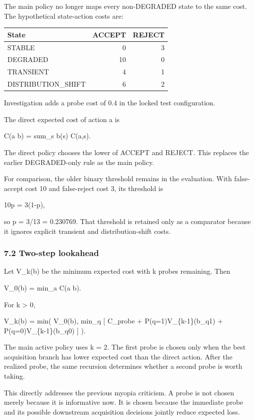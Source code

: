 \documentclass[
]{article}
\begin{document}
The main policy no longer maps every non-DEGRADED state to the same cost. The hypothetical state-action costs are:

\begin{longtable}[]{@{}lrr@{}}
\toprule\noalign{}
State & ACCEPT & REJECT \\
\midrule\noalign{}
\endhead
\bottomrule\noalign{}
\endlastfoot
STABLE & 0 & 3 \\
DEGRADED & 10 & 0 \\
TRANSIENT & 4 & 1 \\
DISTRIBUTION\_SHIFT & 6 & 2 \\
\end{longtable}

Investigation adds a probe cost of 0.4 in the locked test configuration.

The direct expected cost of action a is

C(a \textbar{} b) = sum\_s b(s) C(a,s).

The direct policy chooses the lower of ACCEPT and REJECT. This replaces the earlier DEGRADED-only rule as the main policy.

For comparison, the older binary threshold remains in the evaluation. With false-accept cost 10 and false-reject cost 3, its threshold is

10p = 3(1-p),

so p = 3/13 = 0.230769. That threshold is retained only as a comparator because it ignores explicit transient and distribution-shift costs.

\subsubsection{7.2 Two-step lookahead}\label{72-two-step-lookahead}

Let V\_k(b) be the minimum expected cost with k probes remaining. Then

V\_0(b) = min\_a C(a \textbar{} b).

For k \textgreater{} 0,

V\_k(b) = min( V\_0(b), min\_q {[} C\_probe + P(q=1)V\_\{k-1\}(b\_q1) + P(q=0)V\_\{k-1\}(b\_q0) {]} ).

The main active policy uses k = 2. The first probe is chosen only when the best acquisition branch has lower expected cost than the direct action. After the realized probe, the same recursion determines whether a second probe is worth taking.

This directly addresses the previous myopia criticism. A probe is not chosen merely because it is informative now. It is chosen because the immediate probe and its possible downstream acquisition decisions jointly reduce expected loss.
\end{document}
